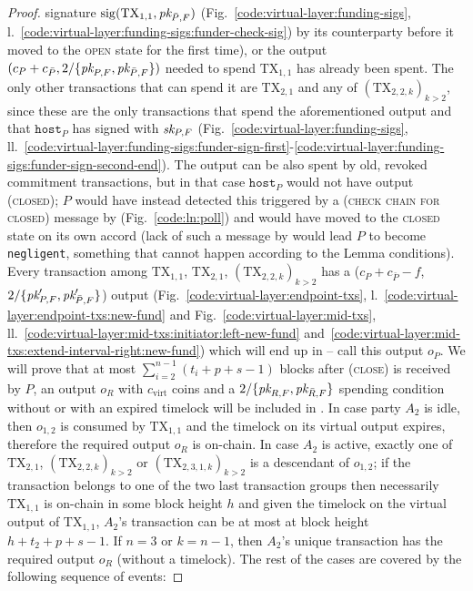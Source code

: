 \begin{proof}
  signature $\mathrm{sig}(\mathrm{TX}_{1, 1}, \textit{pk}_{\bar{P}, F})$
  (Fig.~\ref{code:virtual-layer:funding-sigs},
  l.~\ref{code:virtual-layer:funding-sigs:funder-check-sig}) by its counterparty
  before it moved to the \textsc{open} state for the first time), or the output
  $(c_P + c_{\bar{P}}, 2/\{\textit{pk}_{P, F}, \textit{pk}_{\bar{P}, F}\})$ needed to spend
  $\mathrm{TX}_{1, 1}$ has already been spent. The only other transactions that
  can spend it are $\mathrm{TX}_{2, 1}$ and any of $(\mathrm{TX}_{2, 2, k})_{k >
  2}$, since these are the only transactions that spend the aforementioned
  output and that $\texttt{host}_P$ has signed with $\textit{sk}_{P, F}$
  (Fig.~\ref{code:virtual-layer:funding-sigs},
  ll.~\ref{code:virtual-layer:funding-sigs:funder-sign-first}-\ref{code:virtual-layer:funding-sigs:funder-sign-second-end}).
  The output can be also spent by old, revoked commitment transactions, but in
  that case $\texttt{host}_P$ would not have output (\textsc{closed}); $P$ would
  have instead detected this triggered by a (\textsc{check chain for closed})
  message by \environment (Fig.~\ref{code:ln:poll}) and would have moved to the
  \textsc{closed} state on its own accord (lack of such a message by
  \environment would lead $P$ to become \texttt{negligent}, something that
  cannot happen according to the Lemma conditions). Every transaction among
  $\mathrm{TX}_{1, 1}$, $\mathrm{TX}_{2, 1}$, $(\mathrm{TX}_{2, 2, k})_{k > 2}$
  has a ($c_P + c_{\bar{P}} - f$, $2/\{\textit{pk}_{P, F}', \textit{pk}_{\bar{P}, F}'\}$) output
  (Fig.~\ref{code:virtual-layer:endpoint-txs},
  l.~\ref{code:virtual-layer:endpoint-txs:new-fund} and
  Fig.~\ref{code:virtual-layer:mid-txs},
  ll.~\ref{code:virtual-layer:mid-txs:initiator:left-new-fund}
  and~\ref{code:virtual-layer:mid-txs:extend-interval-right:new-fund}) which
  will end up in \ledger{} -- call this output $o_P$. We will prove that at most
  $\sum\limits_{i=2}^{n-1}(t_i + p + s - 1)$ blocks after (\textsc{close}) is
  received by $P$, an output $o_R$ with $c_{\mathrm{virt}}$ coins and a
  $2/\{\textit{pk}_{R, F}, \textit{pk}_{\bar{R}, F}\}$ spending condition without or with an
  expired timelock will be included in \ledger. In case party $A_2$ is idle,
  then $o_{1, 2}$ is consumed by $\mathrm{TX}_{1, 1}$ and the timelock on its
  virtual output expires, therefore the required output $o_R$ is on-chain.  In
  case $A_2$ is active, exactly one of $\mathrm{TX}_{2, 1}$, $(\mathrm{TX}_{2,
  2, k})_{k > 2}$ or $(\mathrm{TX}_{2, 3, 1, k})_{k > 2}$ is a descendant of
  $o_{1, 2}$; if the transaction belongs to one of the two last transaction
  groups then necessarily $\mathrm{TX}_{1, 1}$ is on-chain in some block height
  $h$ and given the timelock on the virtual output of $\mathrm{TX}_{1, 1}$,
  $A_2$'s transaction can be at most at block height $h + t_2 + p + s - 1$. If
  $n=3$ or $k=n-1$, then $A_2$'s unique transaction has the required output
  $o_R$ (without a timelock). The rest of the cases are covered by the following
  sequence of events:


\end{proof}
